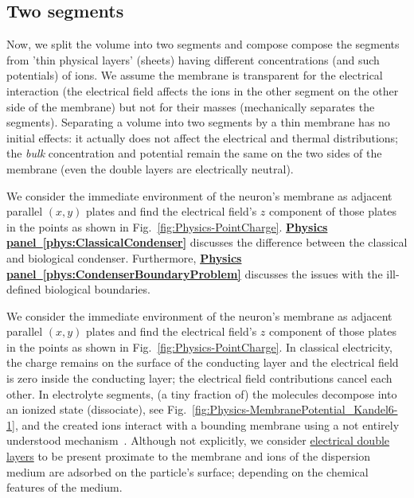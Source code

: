\fi

\ifx\magyar\undefined
\subsection{Two segments\label{sec:Physics-TwoSegments}}

Now, we split the volume into two segments and compose compose the segments from 'thin physical layers' (sheets) having different concentrations (and such potentials) of ions.
We assume the membrane is transparent
for the electrical interaction (the electrical field affects the ions
in the other segment on the other side of the membrane) but not for
their masses (mechanically separates the segments). 
Separating a volume into two segments by a thin membrane has no initial effects: it actually does not affect the electrical and thermal distributions; the
\emph{bulk} concentration and potential remain the same on the two
sides of the membrane (even the double layers are electrically neutral).

We consider the immediate environment of the neuron's membrane
as adjacent parallel $(x,y)$ plates and find the electrical field's $z$ component of those plates in the points
as shown in Fig.~\ref{fig:Physics-PointCharge}. 
\hyperlink{phys:ClassicalCondenser}
{\textbf{Physics panel~\ref{phys:ClassicalCondenser}}}
discusses  the difference between the classical and biological condenser.
Furthermore,
\hyperlink{phys:CondenserBoundaryProblem}
{\textbf{Physics panel~\ref{phys:CondenserBoundaryProblem}}}
discusses 
the issues with the ill-defined biological boundaries.
\else

\fi



\ifx\magyar\undefined
We consider the immediate environment of the neuron's membrane
as adjacent parallel $(x,y)$ plates and find the electrical field's $z$ component of those plates in the points
as shown in Fig.~\ref{fig:Physics-PointCharge}.
%
In classical electricity, the charge remains on the surface of the conducting layer and the electrical field is zero inside the conducting layer; the electrical 
field contributions cancel each other.
In electrolyte segments, (a tiny fraction of) the molecules decompose into an ionized state (dissociate), see Fig.~\ref{fig:Physics-MembranePotential_Kandel6-1}, and the created ions interact with a bounding
membrane using a not entirely understood mechanism~\cite{MembraneBindingDipole:2025}.  Although not explicitly, we consider \href{https://www.sciencedirect.com/topics/engineering/electric-double-layer}{electrical double layers} to be present proximate to the membrane and ions of the dispersion medium are adsorbed on the particle's surface; depending on the chemical features of the medium.



